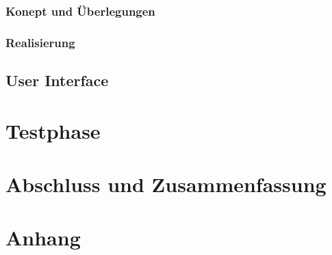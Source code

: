 \documentclass[11pt]{article}
\begin{document}
\subsubsection{Konept und Überlegungen}
\subsubsection{Realisierung}

\subsection{User Interface}


\section{Testphase}


\section{Abschluss und Zusammenfassung}


\section{Anhang}
\end{document}

